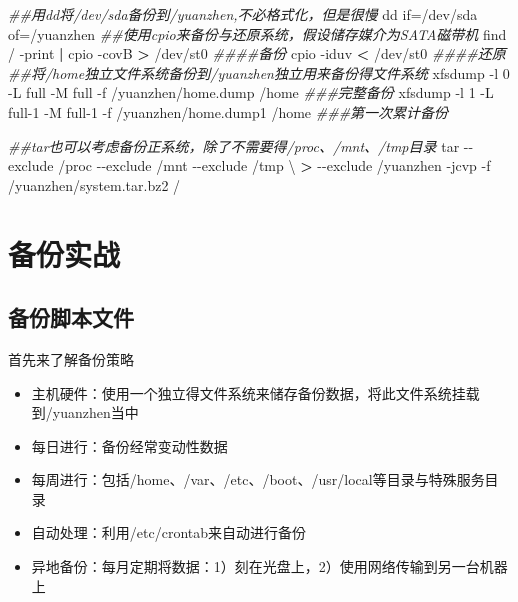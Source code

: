 \documentclass[
]{book}
\newenvironment{Shaded}{\begin{snugshade}}{\end{snugshade}}
\newcommand{\AttributeTok}[1]{\textcolor[rgb]{0.77,0.63,0.00}{#1}}
\newcommand{\CommentTok}[1]{\textcolor[rgb]{0.56,0.35,0.01}{\textit{#1}}}
\newcommand{\DataTypeTok}[1]{\textcolor[rgb]{0.13,0.29,0.53}{#1}}
\newcommand{\ExtensionTok}[1]{#1}
\newcommand{\FunctionTok}[1]{\textcolor[rgb]{0.00,0.00,0.00}{#1}}
\newcommand{\KeywordTok}[1]{\textcolor[rgb]{0.13,0.29,0.53}{\textbf{#1}}}
\newcommand{\NormalTok}[1]{#1}
\newcommand{\OperatorTok}[1]{\textcolor[rgb]{0.81,0.36,0.00}{\textbf{#1}}}
\newcommand{\StringTok}[1]{\textcolor[rgb]{0.31,0.60,0.02}{#1}}
\providecommand{\tightlist}{%
  \setlength{\itemsep}{0pt}\setlength{\parskip}{0pt}}
\begin{document}
\begin{Shaded}
\begin{Highlighting}[]
\CommentTok{\#\#用dd将/dev/sda备份到/yuanzhen,不必格式化，但是很慢}
\FunctionTok{dd}\NormalTok{ if=/dev/sda of=/yuanzhen}
\CommentTok{\#\#使用cpio来备份与还原系统，假设储存媒介为SATA磁带机}
\FunctionTok{find}\NormalTok{ / }\AttributeTok{{-}print} \KeywordTok{|} \FunctionTok{cpio} \AttributeTok{{-}covB} \OperatorTok{\textgreater{}}\NormalTok{ /dev/st0 }\CommentTok{\#\#\#\#备份}
\FunctionTok{cpio} \AttributeTok{{-}iduv} \OperatorTok{\textless{}}\NormalTok{ /dev/st0 }\CommentTok{\#\#\#\#还原}
\CommentTok{\#\#将/home独立文件系统备份到/yuanzhen独立用来备份得文件系统}
\ExtensionTok{xfsdump} \AttributeTok{{-}l}\NormalTok{ 0 }\AttributeTok{{-}L} \StringTok{\textquotesingle{}full\textquotesingle{}} \AttributeTok{{-}M} \StringTok{\textquotesingle{}full\textquotesingle{}} \AttributeTok{{-}f}\NormalTok{ /yuanzhen/home.dump /home  }\CommentTok{\#\#\#完整备份}
\ExtensionTok{xfsdump} \AttributeTok{{-}l}\NormalTok{ 1 }\AttributeTok{{-}L} \StringTok{\textquotesingle{}full{-}1\textquotesingle{}} \AttributeTok{{-}M} \StringTok{\textquotesingle{}full{-}1\textquotesingle{}} \AttributeTok{{-}f}\NormalTok{ /yuanzhen/home.dump1 /home }\CommentTok{\#\#\#第一次累计备份}

\CommentTok{\#\#tar也可以考虑备份正系统，除了不需要得/proc、/mnt、/tmp目录}
\FunctionTok{tar} \AttributeTok{{-}{-}exclude}\NormalTok{ /proc }\AttributeTok{{-}{-}exclude}\NormalTok{ /mnt }\AttributeTok{{-}{-}exclude}\NormalTok{ /tmp }\DataTypeTok{\textbackslash{}}
\OperatorTok{\textgreater{}}\NormalTok{ {-}{-}exclude /yuanzhen }\AttributeTok{{-}jcvp} \AttributeTok{{-}f}\NormalTok{ /yuanzhen/system.tar.bz2 /}
\end{Highlighting}
\end{Shaded}

\hypertarget{ux5907ux4efdux5b9eux6218}{%
\chapter{备份实战}\label{ux5907ux4efdux5b9eux6218}}

\hypertarget{ux5907ux4efdux811aux672cux6587ux4ef6}{%
\section{备份脚本文件}\label{ux5907ux4efdux811aux672cux6587ux4ef6}}

首先来了解备份策略

\begin{itemize}
\tightlist
\item
  主机硬件：使用一个独立得文件系统来储存备份数据，将此文件系统挂载到/yuanzhen当中
\item
  每日进行：备份经常变动性数据
\item
  每周进行：包括/home、/var、/etc、/boot、/usr/local等目录与特殊服务目录
\item
  自动处理：利用/etc/crontab来自动进行备份
\item
  异地备份：每月定期将数据：1）刻在光盘上，2）使用网络传输到另一台机器上
\end{itemize}
\end{document}
